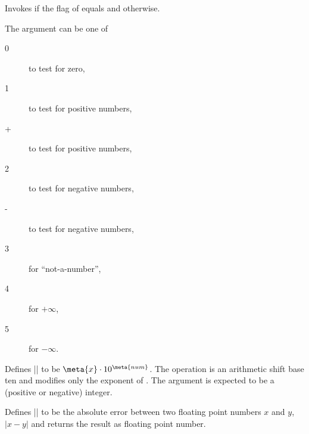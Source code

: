 \begin{command}{\pgfmathfloatifflags{}}
	Invokes  if the flag of  equals  and  otherwise.

	The argument  can be one of
	\begin{description}
		\item[0] to test for zero,
		\item[1] to test for positive numbers,
		\item[+] to test for positive numbers,
		\item[2] to test for negative numbers,
		\item[-] to test for negative numbers,
		\item[3] for ``not-a-number'',
		\item[4] for $+\infty$,
		\item[5] for $-\infty$.
	\end{description}
	
\begin{codeexample}[]

\end{codeexample}
\end{command}


\begin{command}{}
	Defines |\pgfmathresult| to be $\meta{x} \cdot 10^{\meta{num}}$. The operation is an arithmetic shift base ten and modifies only the exponent of . The argument  is expected to be a (positive or negative) integer.
\end{command}


\begin{command}{\pgfmathfloatabserror{}}
	Defines |\pgfmathresult| to be the absolute error between two floating point numbers $x$ and $y$, $\lvert x - y\rvert $ and returns the result as floating point number.
\end{command}

